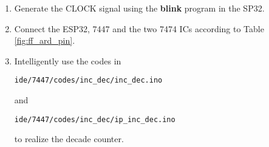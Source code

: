 \begin{enumerate}
\item Generate the CLOCK signal using the \textbf{blink} program in the SP32.
\item Connect the ESP32, 7447 and the two 7474 ICs according to Table \ref{fig:ff_ard_pin}.
\begin{table}[H]
\centering

\caption{}
\label{fig:ff_ard_pin}
\end{table}
%
%
\item
Intelligently use the codes in 
\begin{lstlisting}
ide/7447/codes/inc_dec/inc_dec.ino
\end{lstlisting}
and
\begin{lstlisting}
ide/7447/codes/inc_dec/ip_inc_dec.ino
\end{lstlisting}
to realize the decade counter.
\end{enumerate}



